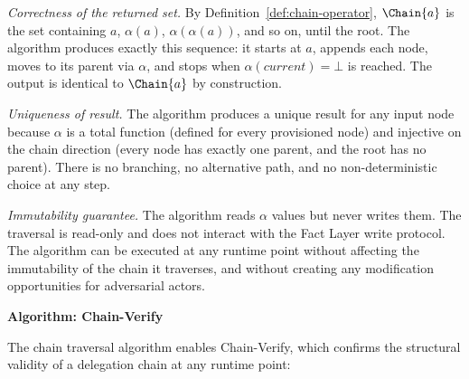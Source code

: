\textit{Correctness of the returned set.} By Definition~\ref{def:chain-operator}, $\Chain{a}$ is the set containing $a$, $\alpha(a)$, $\alpha(\alpha(a))$, and so on, until the root. The algorithm produces exactly this sequence: it starts at $a$, appends each node, moves to its parent via $\alpha$, and stops when $\alpha(current) = \bot$ is reached. The output is identical to $\Chain{a}$ by construction.

\textit{Uniqueness of result.} The algorithm produces a unique result for any input node because $\alpha$ is a total function (defined for every provisioned node) and injective on the chain direction (every node has exactly one parent, and the root has no parent). There is no branching, no alternative path, and no non-deterministic choice at any step.

\textit{Immutability guarantee.} The algorithm reads $\alpha$ values but never writes them. The traversal is read-only and does not interact with the Fact Layer write protocol. The algorithm can be executed at any runtime point without affecting the immutability of the chain it traverses, and without creating any modification opportunities for adversarial actors.

\medskip
\noindent\textbf{Algorithm: Chain-Verify}

The chain traversal algorithm enables Chain-Verify, which confirms the structural validity of a delegation chain at any runtime point:

